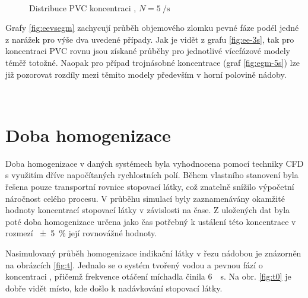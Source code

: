 \begin{figure}[h!]
 \centering
  \qquad 
  \\
  \caption{Distribuce PVC koncentraci , $N=\SI{5}{\per\second}$}
  \label{fig:w15}
\end{figure}


Grafy \ref{fig:eevsegm} zachycují průběh objemového zlomku pevné fáze podél jedné z narážek pro výše dva uvedené případy. Jak je vidět z grafu \ref{fig:ee-3s}, tak pro koncentraci PVC rovnu  jsou získané průběhy pro jednotlivé vícefázové modely téměř totožné. Naopak pro případ trojnásobné koncentrace (graf \ref{fig:egm-5s}) lze již pozorovat rozdíly mezi těmito modely především v horní polovině nádoby. 


\begin{grf}[h!]
 \centering
  \\ 
  \caption{Průběh objemového zlomku pevné fáze, \pvpS}
  \label{fig:eevsegm}
\end{grf}
\newpage

\section{Doba homogenizace}
Doba homogenizace v daných systémech byla vyhodnocena pomocí techniky CFD s využitím dříve napočítaných rychlostních polí. Během vlastního stanovení byla řešena pouze transportní rovnice stopovací látky, což znatelně snížilo výpočetní náročnost celého procesu. V průběhu simulací byly zaznamenávány okamžité hodnoty koncentrací stopovací látky v závislosti na čase. Z uložených dat byla poté doba homogenizace určena jako čas potřebný k ustálení této koncentrace v rozmezí \SI{\pm 5}{\percent} její rovnovážné hodnoty.

Nasimulovaný průběh homogenizace indikační látky v řezu nádobou je znázorněn na obrázcích \ref{fig:t}. Jednalo se o systém tvořený vodou a pevnou fází o koncentraci , přičemž frekvence otáčení míchadla činila \SI{6}{\per\second}. Na obr. \ref{fig:t0} je dobře vidět místo, kde došlo k nadávkování stopovací látky.

